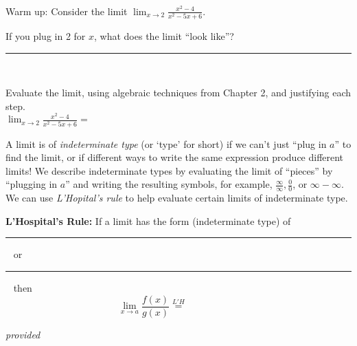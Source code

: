 \documentclass[11pt,fleqn]{article}
\renewcommand{\d}{\displaystyle}
\newcommand{\ans}[1][2]{ \ \rule{#1 in}{.5 pt} \ }
\begin{document}
\vspace*{-0.7in}

\begin{center}
  \Large
  \\
\end{center}

{\sc Warm up:} Consider the limit  $\d \lim_{x \to 2} \frac{x^2 - 4}{x^2 - 5x + 6}$. 

If you plug in 2 for $x$, what does the limit ``look like''? \ans

Evaluate the limit, using algebraic techniques from Chapter 2, and justifying each step.\\

     $\d \lim_{x \to 2} \frac{x^2 - 4}{x^2 - 5x + 6} = $
\vspace{1.5in}


 A limit is of \emph{indeterminate type} (or `type' for short) if we can't just ``plug in $a$'' to find the limit, or if different ways to write the same expression produce different limits! We describe indeterminate types by evaluating the limit of ``pieces'' by ``plugging in $a$'' and writing the resulting symbols, for example, $\frac{\infty}{\infty}, \frac{0}{0}$, or $\infty - \infty$. We can use \emph{L'Hopital's rule} to help evaluate certain limits of indeterminate type.

\begin{framed}
  \textbf{L'Hospital's Rule:} If a limit has the form (indeterminate type) of \ans[.75] or \ans[.75]
  then $$\d \lim_{x \to a} \frac{f(x)}{g(x)} \overset{L'H}{=} \phantom{\d \lim_{x \to a} \frac{f(x)}{g(x)}}$$
  
  
  \emph{provided} 
  
  
   \end{framed} 
\end{document}
